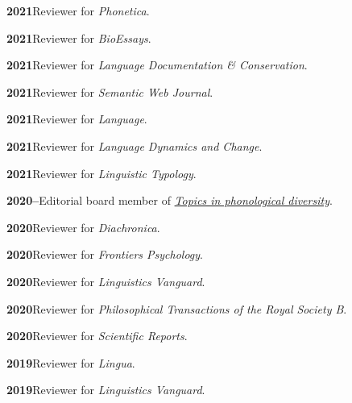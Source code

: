 \documentclass[11pt]{article}
\newcommand{\hangpara}{
 \setlength{\parindent}{0in} %
 \hangindent=0.42in %
}
\begin{document}
\vskip 6pt
\hangpara
{\bf 2021}\hspace{1ex}Reviewer for \textit{Phonetica}.

\vskip 6pt
\hangpara
{\bf 2021}\hspace{1ex}Reviewer for \textit{BioEssays}.

\vskip 6pt
\hangpara
{\bf 2021}\hspace{1ex}Reviewer for \textit{Language Documentation \& Conservation}.

\vskip 6pt
\hangpara
{\bf 2021}\hspace{1ex}Reviewer for \textit{Semantic Web Journal}.

\hangpara
\vskip 6pt
{\bf 2021}\hspace{1ex}Reviewer for \textit{Language}.

\vskip 6pt
\hangpara
{\bf 2021}\hspace{1ex}Reviewer for \textit{Language Dynamics and Change}.

\vskip 6pt
\hangpara
{\bf 2021}\hspace{1ex}Reviewer for \textit{Linguistic Typology}.

\vskip 6pt
\hangpara
{\bf 2020--}\hspace{1ex}Editorial board member of \textit{\href{https://langsci-press.org/catalog/series/tpd}{Topics in phonological diversity}}.

\vskip 6pt
\hangpara
{\bf 2020}\hspace{1ex}Reviewer for \textit{Diachronica}.

\vskip 6pt
\hangpara
{\bf 2020}\hspace{1ex}Reviewer for \textit{Frontiers Psychology}.

\vskip 6pt
\hangpara
{\bf 2020}\hspace{1ex}Reviewer for \textit{Linguistics Vanguard}.

\vskip 6pt
\hangpara
{\bf 2020}\hspace{1ex}Reviewer for \textit{Philosophical Transactions of the Royal Society B}.

\vskip 6pt
\hangpara
{\bf 2020}\hspace{1ex}Reviewer for \textit{Scientific Reports}.

\vskip 6pt
\hangpara
{\bf 2019}\hspace{1ex}Reviewer for \textit{Lingua}.

\vskip 6pt
\hangpara
{\bf 2019}\hspace{1ex}Reviewer for \textit{Linguistics Vanguard}.
\end{document}
